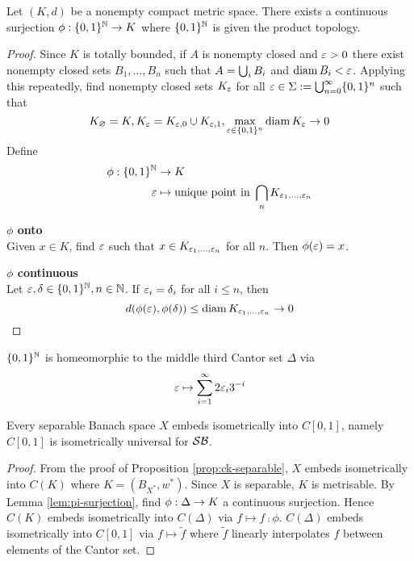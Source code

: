 \documentclass{article}
\begin{document}
\begin{nlemma}\label{lem:pi-surjection}
  Let $(K, d)$ be a nonempty compact metric space. There exists a continuous surjection $\phi : \{0, 1\}^\mathbb N \rightarrow K$ where $\{0, 1\}^\mathbb N$ is given the product topology.
\end{nlemma}
\begin{proof}
  Since $K$ is totally bounded, if $A$ is nonempty closed and $\varepsilon > 0$ there exist nonempty closed sets $B_1, \dots, B_n$ such that $A = \bigcup_i B_i$ and $\operatorname{diam} B_i < \varepsilon$. Applying this repeatedly, find nonempty closed sets $K_\varepsilon$ for all $\varepsilon \in \Sigma := \bigcup_{n = 0}^\infty \{0, 1\}^n$ such that
  $$K_\varnothing = K, K_\varepsilon = K_{\varepsilon, 0} \cup K_{\varepsilon, 1}, \max_{\varepsilon \in \{0, 1\}^n} \operatorname{diam} K_\varepsilon \rightarrow 0$$
  Define
  \begin{align*}
    \phi : \{0, 1\}^\mathbb N & \rightarrow K \\
    \varepsilon & \mapsto \text{unique point in } \bigcap_n K_{\varepsilon_1, \dots, \varepsilon_n}
  \end{align*}

  {\bf $\phi$ onto} \\
  Given $x \in K$, find $\varepsilon$ such that $x \in K_{\varepsilon_1, \dots, \varepsilon_n}$ for all $n$. Then $\phi(\varepsilon) = x$.

  {\bf $\phi$ continuous} \\
  Let $\varepsilon, \delta \in \{0, 1\}^\mathbb N, n \in \mathbb N$. If $\varepsilon_i = \delta_i$ for all $i \le n$, then
  $$d(\phi(\varepsilon), \phi(\delta)) \le \operatorname{diam} K_{\varepsilon_1, \dots, \varepsilon_n} \rightarrow 0$$
\end{proof}

\begin{rmk}
  $\{0, 1\}^\mathbb N$ is homeomorphic to the middle third Cantor set $\Delta$ via
  $$\varepsilon \mapsto \sum_{i = 1}^\infty 2\varepsilon_i 3^{-i}$$
\end{rmk}

\begin{nthm}
  Every separable Banach space $X$ embeds isometrically into $C[0, 1]$, namely $C[0, 1]$ is isometrically universal for $\mathcal S\mathcal B$.
\end{nthm}
\begin{proof}
  From the proof of Proposition \ref{prop:ck-separable}, $X$ embeds isometrically into $C(K)$ where $K = (B_{X^*}, w^*)$. Since $X$ is separable, $K$ is metrisable. By Lemma \ref{lem:pi-surjection}, find $\phi : \Delta \rightarrow K$ a continuous surjection. Hence $C(K)$ embeds isometrically into $C(\Delta)$ via $f \mapsto f \comp \phi$. $C(\Delta)$ embeds isometrically into $C[0, 1]$ via $f \mapsto \tilde f$ where $\tilde f$ linearly interpolates $f$ between elements of the Cantor set.
\end{proof}
\end{document}
